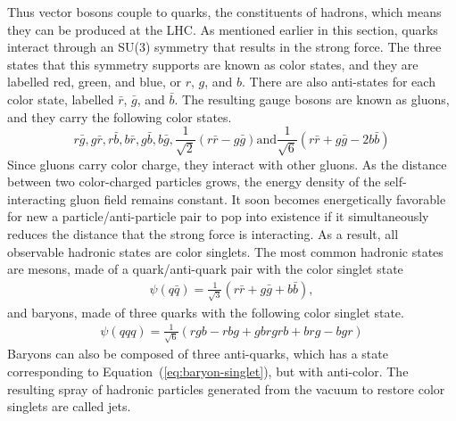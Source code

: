 Thus vector bosons couple to quarks, the constituents of hadrons,
which means they can be produced at the LHC.
As mentioned earlier in this section,
quarks interact through an SU(3) symmetry that results in the strong force.
The three states that this symmetry supports are known as color states,
and they are labelled red, green, and blue, or $r$, $g$, and $b$.
There are also anti-states for each color state,
labelled $\bar{r}$, $\bar{g}$, and $\bar{b}$.
The resulting gauge bosons are known as gluons, and they carry the following color states.
\[
r\bar{g}, g\bar{r}, r\bar{b}, b\bar{r}, g\bar{b}, b\bar{g}, \frac{1}{\sqrt{2}}(r\bar{r} - g\bar{g}) \mathrm{and} \frac{1}{\sqrt{6}}(r\bar{r} + g\bar{g} - 2b\bar{b})
\]
Since gluons carry color charge, they interact with other gluons.
As the distance between two color-charged particles grows,
the energy density of the self-interacting gluon field remains constant.
It soon becomes energetically favorable for new a particle/anti-particle pair
to pop into existence if it simultaneously reduces the distance that the strong force is interacting.
As a result, all observable hadronic states are color singlets.
The most common hadronic states are mesons, made of a quark/anti-quark pair
with the color singlet state
\begin{gather}
  \psi(q\bar{q}) = \frac1{\sqrt{3}} (r\bar{r} + g\bar{g} + b\bar{b}),
\end{gather}
and baryons, made of three quarks with the following color singlet state.
\begin{gather}
  \psi(qqq) = \frac{1}{\sqrt{6}}(rgb - rbg + gbr  grb + brg - bgr) \label{eq:baryon-singlet}
\end{gather}
Baryons can also be composed of three anti-quarks,
which has a state corresponding to Equation~(\ref{eq:baryon-singlet}),
but with anti-color.
The resulting spray of hadronic particles generated from the vacuum to restore
color singlets are called jets. 

